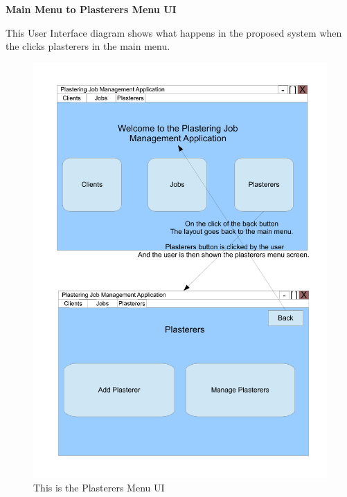 \pagebreak
\textbf{Main Menu to Plasterers Menu UI}
\begin{flushleft}
This User Interface diagram shows what happens in the proposed system when the clicks plasterers in the main menu.
\end{flushleft}
\begin{figure}[H]
\includegraphics[scale=0.5]{./Design/images/PlasterersMenu.pdf}
    \caption{This is the Plasterers Menu UI} 
\label{fig:FlowChartPlasterersMenu}
\end{figure}


